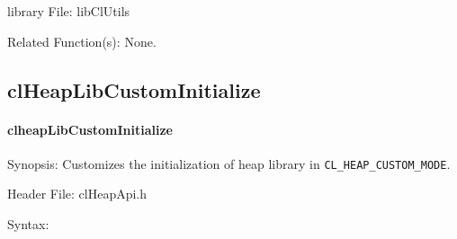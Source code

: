 \begin{flushleft}
\begin{Desc}
\end{Desc}
\begin{Desc}
\item[library File:]libClUtils\end{Desc}
\begin{Desc}
\item[Related Function(s):] None.
\end{Desc}
\newpage



\subsection{clHeapLibCustomInitialize}
\hypertarget{pageheap130}{}\paragraph{cl\-heap\-Lib\-Custom\-Initialize}\label{pageheap130}
\begin{Desc}
\item[Synopsis:]Customizes the initialization of heap library in {\tt{CL\_\-HEAP\_\-CUSTOM\_\-MODE}}. \end{Desc}
\begin{Desc}
\item[Header File:]clHeapApi.h\end{Desc}
\begin{Desc}
\item[Syntax:]


\end{Desc}
\end{flushleft}
